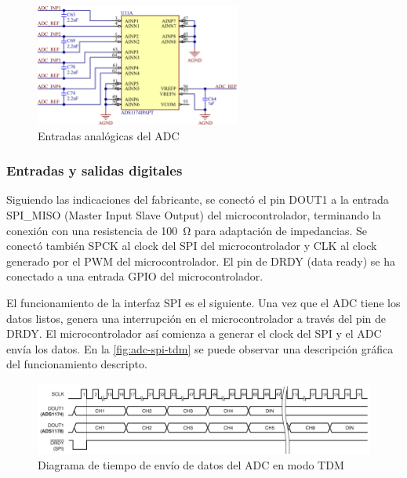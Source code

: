 \documentclass[../et.tex]{subfiles}
\begin{document}
\begin{figure}[!htbp]
  \centering
  \includegraphics[width=0.6\textwidth]{../images/adc-inputs.png}
  \caption{Entradas analógicas del ADC}
  \label{fig:adc-inputs}
\end{figure}

\subsubsection{Entradas y salidas digitales}
Siguiendo las indicaciones del fabricante, se conectó el pin DOUT1 a la entrada SPI\_MISO (Master Input Slave Output) del microcontrolador, terminando la conexión con una resistencia de \SI{100}{\ohm} para adaptación de impedancias. Se conectó también SPCK al clock del SPI del microcontrolador y CLK al clock generado por el PWM del microcontrolador. El pin de DRDY (data ready) se ha conectado a una entrada GPIO del microcontrolador.

El funcionamiento de la interfaz SPI es el siguiente. Una vez que el ADC tiene los datos listos, genera una interrupción en el microcontrolador a través del pin de DRDY. El microcontrolador así comienza a generar el clock del SPI y el ADC envía los datos. En la \autoref{fig:adc-spi-tdm} se puede observar una descripción gráfica del funcionamiento descripto.

\begin{figure}[!htbp]
  \centering
  \includegraphics[scale=0.4]{../images/adc-spi-tdm.png}
  \caption{Diagrama de tiempo de envío de datos del ADC en modo TDM}
  \label{fig:adc-spi-tdm}
\end{figure}
\end{document}
